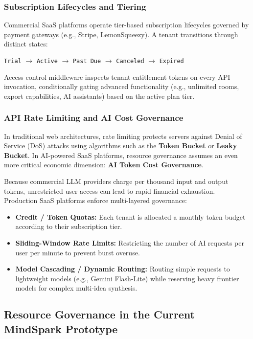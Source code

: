 \subsubsection{Subscription Lifecycles and Tiering}
Commercial SaaS platforms operate tier-based subscription lifecycles governed by payment gateways (e.g., Stripe, LemonSqueezy). A tenant transitions through distinct states:
\begin{center}
    \texttt{Trial} $\rightarrow$ \texttt{Active} $\rightarrow$ \texttt{Past Due} $\rightarrow$ \texttt{Canceled} $\rightarrow$ \texttt{Expired}
\end{center}
\noindent Access control middleware inspects tenant entitlement tokens on every API invocation, conditionally gating advanced functionality (e.g., unlimited rooms, export capabilities, AI assistants) based on the active plan tier.

\subsubsection{API Rate Limiting and AI Cost Governance}
In traditional web architectures, rate limiting protects servers against Denial of Service (DoS) attacks using algorithms such as the \textbf{Token Bucket} or \textbf{Leaky Bucket}. In AI-powered SaaS platforms, resource governance assumes an even more critical economic dimension: \textbf{AI Token Cost Governance}.

Because commercial LLM providers charge per thousand input and output tokens, unrestricted user access can lead to rapid financial exhaustion. Production SaaS platforms enforce multi-layered governance:
\begin{itemize}
    \item \textbf{Credit / Token Quotas:} Each tenant is allocated a monthly token budget according to their subscription tier.
    \item \textbf{Sliding-Window Rate Limits:} Restricting the number of AI requests per user per minute to prevent burst overuse.
    \item \textbf{Model Cascading / Dynamic Routing:} Routing simple requests to lightweight models (e.g., Gemini Flash-Lite) while reserving heavy frontier models for complex multi-idea synthesis.
\end{itemize}


\subsection{Resource Governance in the Current MindSpark Prototype}
\label{subsec:mindspark_saas_status}

